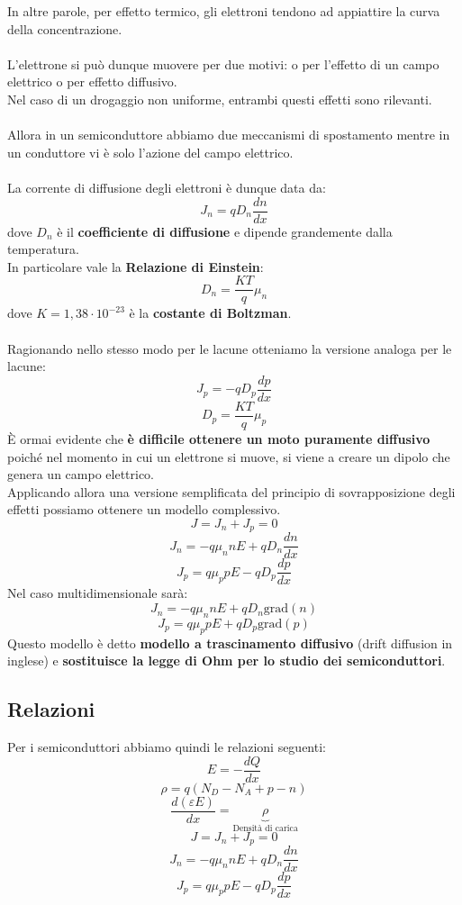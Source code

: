 \documentclass{article}
\numberwithin{equation}{subsection}
\begin{document}
	In altre parole, per effetto termico, gli elettroni tendono ad appiattire la curva della concentrazione.\\\\
	L’elettrone si può dunque muovere per due motivi: o per l’effetto di un campo elettrico o per effetto diffusivo. \\
	Nel caso di un drogaggio non uniforme, entrambi questi effetti sono rilevanti.\\\\
	Allora in un semiconduttore abbiamo due meccanismi di spostamento mentre in un conduttore vi è solo l’azione del campo elettrico.\\\\
	La corrente di diffusione degli elettroni è dunque data da:
	$$J_n = q D_n \frac{dn}{dx}$$
	dove $D_n$ è il \textbf{coefficiente di diffusione} e dipende grandemente dalla temperatura. \\
	In particolare vale la \textbf{Relazione di Einstein}:
	$$D_n = \frac{KT}{q} \mu_n$$
	dove $K = 1,38 \cdot 10^{-23}$ è la \textbf{costante di Boltzman}.\\\\
	Ragionando nello stesso modo per le lacune otteniamo la versione analoga per le lacune:
	$$J_p = -q D_p \frac{dp}{dx}$$
	$$D_p = \frac{KT}{q} \mu_p$$
	È ormai evidente che \textbf{è difficile ottenere un moto puramente diffusivo} poiché nel momento in cui un elettrone si muove, si viene a creare un dipolo che genera un campo elettrico. \\
	Applicando allora una versione semplificata del principio di sovrapposizione degli effetti possiamo ottenere un modello complessivo.
	$$J = J_n + J_p = 0$$
	$$J_n = -q \mu_n n E + q D_n \frac{dn}{dx}$$
	$$J_p = q \mu_p p E - q D_p \frac{dp}{dx}$$
	Nel caso multidimensionale sarà:
	$$J_n = -q \mu_n n E + q D_n \text{grad}(n)$$
	$$J_p = q \mu_p p E + q D_p \text{grad}(p)$$
	Questo modello è detto \textbf{modello a trascinamento diffusivo} (drift diffusion in inglese) e \textbf{sostituisce la legge di Ohm per lo studio dei semiconduttori}.
	\subsection{Relazioni}
	Per i semiconduttori abbiamo quindi le relazioni seguenti:
	$$E = -\frac{dQ}{dx}$$
	$$\rho = q(N_D - N_A + p - n)$$
	$$\frac{d(\varepsilon E)}{dx} = \underbrace{\rho}_{\text{Densità di carica}}$$
	$$J = J_n + J_p = 0$$
	$$J_n = -q\mu_n n E + qD_n \frac{dn}{dx}$$
	$$J_p = q\mu_p p E - qD_p \frac{dp}{dx}$$
\end{document}
